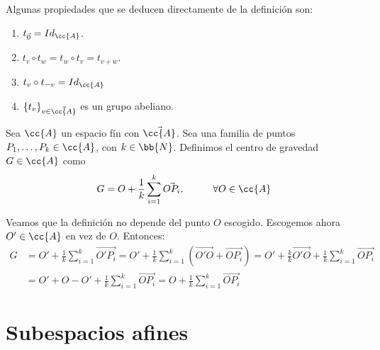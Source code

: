 Algunas propiedades que se deducen directamente de la definición son:
\begin{enumerate}
    \item $t_{\vec{0}}=Id_{\cc{A}}$.
    \item $t_v\circ t_w = t_w\circ t_v = t_{v+w}$.
    \item $t_v\circ t_{-v}=Id_{\cc{A}}$
    \item $\{t_v\}_{v\in \vec{\cc{A}}}$ es un grupo abeliano.
\end{enumerate}


\begin{definicion}
    Sea $\cc{A}$ un espacio fín con $\vec{\cc{A}}$. Sea una familia de puntos $P_1,\dots,P_k\in \cc{A}$, con $k\in \bb{N}$. Definimos el centro de gravedad $G\in \cc{A}$ como
    $$G=O+\frac{1}{k}\sum_{i=1}^k \vec{OP_i}, \hspace{1cm} \forall O\in \cc{A}$$
\end{definicion}

Veamos que la definición no depende del punto $O$ escogido. Escogemos ahora $O'\in \cc{A}$ en vez de $O$. Entonces:
\begin{equation*}\begin{split}
    G&=O'+\frac{1}{k}\sum_{i=1}^k \vec{O'P_i}
    =O'+\frac{1}{k}\sum_{i=1}^k (\vec{O'O} + \vec{OP_i})
    = O' + \frac{k}{k}\vec{O'O} + \frac{1}{k}\sum_{i=1}^k \vec{OP_i}\\
    &= O' + O-O' + \frac{1}{k}\sum_{i=1}^k \vec{OP_i}
    = O+\frac{1}{k}\sum_{i=1}^k \vec{OP_i}
\end{split}\end{equation*}

\section{Subespacios afines}

